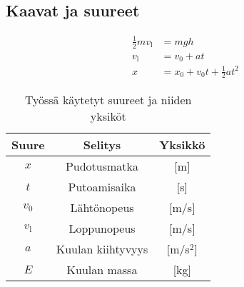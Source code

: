 \documentclass[a4paper,12pt]{article}
\begin{document}

\subsection{Kaavat ja suureet}


\begin{align} %
\frac{1}{2} m v_{\mathrm l} &= mgh \\ %
v_{\mathrm l} &= v_{\mathrm 0} + at\\
x &= x_{\mathrm 0} + v_{\mathrm 0} t + \frac{1}{2} a t^{2}
\end{align}


\begin{table}[h]
\begin{center}
\caption{Työssä käytetyt suureet ja niiden yksiköt}
\label{kaytetytsuureet} %
\begin{tabular}{c|c|c} %
Suure & Selitys & Yksikkö \\ \hline %
$x$&Pudotusmatka&[m]\\  %
$t$&Putoamisaika& [s]\\  
$v_{\mathrm 0}$&Lähtönopeus&[m/s]\\  
$v_{\mathrm l}$& Loppunopeus& [m/s]\\  
$a$& Kuulan kiihtyvyys& [m/s$^2$]\\  
$E$& Kuulan massa& [kg]
\end{tabular}
\end{center}
\end{table}
\pagebreak %
\end{document}

